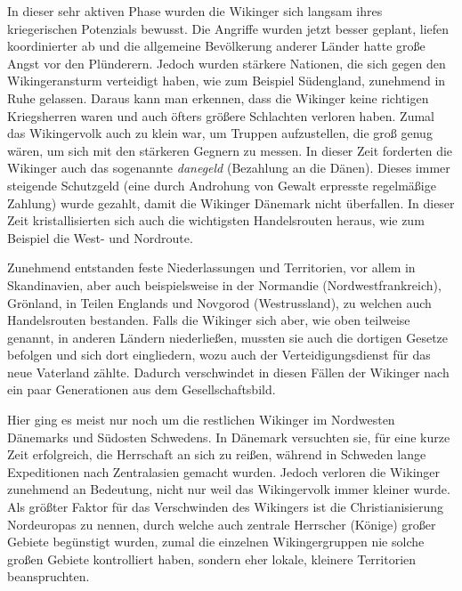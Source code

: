 \documentclass[12pt,a4paper,ngerman,openany]{book}
\begin{document}
\begin{tcolorbox}[sharp corners, title=Ungefähr 850 bis 900]
In dieser sehr aktiven Phase wurden die Wikinger sich langsam ihres kriegerischen Potenzials bewusst. Die Angriffe wurden jetzt besser geplant, liefen koordinierter ab und die allgemeine Bevölkerung anderer Länder hatte große Angst vor den Plünderern.
Jedoch wurden stärkere Nationen, die sich gegen den Wikingeransturm verteidigt haben, wie zum Beispiel Südengland, zunehmend in Ruhe gelassen. Daraus kann man erkennen, dass die Wikinger keine richtigen Kriegsherren waren und auch öfters größere Schlachten verloren haben. Zumal das Wikingervolk auch zu klein war, um Truppen aufzustellen, die groß genug wären, um sich mit den stärkeren Gegnern zu messen.
In dieser Zeit forderten die Wikinger auch das sogenannte \textit{danegeld} (\glqq Bezahlung an die Dänen\grqq{}). Dieses immer steigende Schutzgeld (eine durch Androhung von Gewalt erpresste regelmäßige Zahlung) wurde gezahlt, damit die Wikinger Dänemark nicht überfallen.
In dieser Zeit kristallisierten sich auch die wichtigsten Handelsrouten heraus, wie zum Beispiel die West- und Nordroute.
\end{tcolorbox}

\begin{tcolorbox}[sharp corners, title=Ungefähr 900 bis 980]
Zunehmend entstanden feste Niederlassungen und Territorien, vor allem in Skandinavien, aber auch beispielsweise in der Normandie (Nordwestfrankreich), Grönland, in Teilen Englands und Novgorod (Westrussland), zu welchen auch Handelsrouten bestanden. Falls die Wikinger sich aber, wie oben teilweise genannt, in anderen Ländern niederließen, mussten sie auch die dortigen Gesetze befolgen und sich dort eingliedern, wozu auch der Verteidigungsdienst für das \glqq neue\grqq{} Vaterland zählte. Dadurch verschwindet in diesen Fällen \glqq der Wikinger\grqq{} nach ein paar Generationen aus dem Gesellschaftsbild.
\end{tcolorbox}

\begin{tcolorbox}[sharp corners, title=Ungefähr 980 bis 1066]
Hier ging es meist nur noch um die restlichen Wikinger im Nordwesten Dänemarks und Südosten Schwedens. In Dänemark versuchten sie, für eine kurze Zeit erfolgreich, die Herrschaft an sich zu reißen, während in Schweden lange Expeditionen nach Zentralasien gemacht wurden. Jedoch verloren die Wikinger zunehmend an Bedeutung, nicht nur weil das Wikingervolk immer kleiner wurde. Als größter Faktor für das \glqq Verschwinden\grqq{} des Wikingers ist die Christianisierung Nordeuropas zu nennen, durch welche auch zentrale Herrscher (Könige) großer Gebiete begünstigt wurden, zumal die einzelnen Wikingergruppen nie solche großen Gebiete kontrolliert haben, sondern eher lokale, kleinere Territorien beanspruchten.
\end{tcolorbox}
\end{document}
